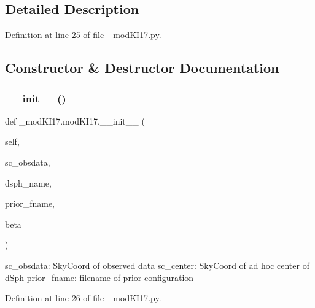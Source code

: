 \subsection{Detailed Description}


Definition at line 25 of file \+\_\+mod\+K\+I17.\+py.



\subsection{Constructor \& Destructor Documentation}
\mbox{\label{class__modKI17_1_1modKI17_a0316df19813ca7e678103de3be2fe354}} 
\subsubsection{\texorpdfstring{\+\_\+\+\_\+init\+\_\+\+\_\+()}{\_\_init\_\_()}}
{\footnotesize\ttfamily def \+\_\+mod\+K\+I17.\+mod\+K\+I17.\+\_\+\+\_\+init\+\_\+\+\_\+ (\begin{DoxyParamCaption}\item[{}]{self,  }\item[{}]{sc\+\_\+obsdata,  }\item[{}]{dsph\+\_\+name,  }\item[{}]{prior\+\_\+fname,  }\item[{}]{beta = {} }\end{DoxyParamCaption})}

\begin{DoxyVerb}sc_obsdata: SkyCoord of observed data
sc_center: SkyCoord of ad hoc center of dSph
prior_fname: filename of prior configuration
\end{DoxyVerb}
 

Definition at line 26 of file \+\_\+mod\+K\+I17.\+py.


